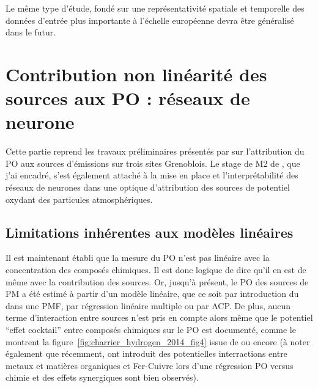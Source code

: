 Le même type d'étude, fondé sur une représentativité spatiale et temporelle des données
d'entrée plus importante à l'échelle européenne devra être généralisé dans le futur.


\section{Contribution non linéarité des sources aux PO : réseaux de neurone}%
\label{sec:reseau_neurone}

\begin{tcolorbox}[colback=red!5!white,colframe=Melon,title=Note]
    Cette partie reprend les travaux préliminaires présentés par \cite{borlazaUrbaninprep.} sur 
    l'attribution du PO aux sources d'émissions sur trois sites Grenoblois. Le stage de M2 de
    \cite{fichesMachine2020}, que j'ai encadré, s'est également attaché à la mise en place et
    l'interprétabilité des réseaux de neurones dans une optique d'attribution des sources
    de potentiel oxydant des particules atmosphériques.
\end{tcolorbox}

\subsection{Limitations inhérentes aux modèles linéaires}%
\label{sub:limitations_inhérentes_aux_modèles_linéaires}


Il est maintenant établi que la mesure du PO n'est pas linéaire avec la concentration des composés
chimiques. Il est donc logique de dire qu'il en est de même avec la contribution des
sources.
Or, jusqu'à présent, le PO des sources de PM a été estimé à partir d'un modèle linéaire,
que ce soit par introduction du \POv{} dans une PMF, par régression linéaire multiple ou
par ACP.
De plus, aucun terme d'interaction entre sources n'est pris en compte alors même que
le potentiel ``effet cocktail'' entre composés chimiques sur le PO est documenté, comme le
montrent la figure~\ref{fig:charrier_hydrogen_2014_fig4} issue de
\cite{charrierHydrogen2014} ou encore 
\cites[figure S7 du supplément]{charrierDithiothreitol2012}{xiongRethinking2017}{samakeUnexpected2017}{yuSynergistic2018}
(à noter également que récemment, \cite{gaoCharacterization2020} ont introduit des
potentielles interractions entre metaux et matières organiques et Fer-Cuivre lors d'une régression PO
versus chimie et des effets synergiques sont bien observés).

